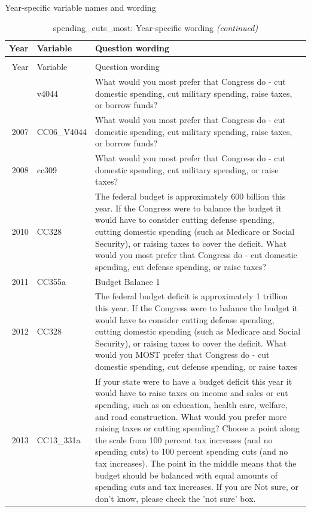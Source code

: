 \documentclass[12pt]{article}
\begin{document}
Year-specific variable names and wording

\begin{longtable}[t]{rl>{\raggedright\arraybackslash}p{10cm}}
\caption{\label{tab:unnamed-chunk-4}spending\_cuts\_most: Year-specific wording}\\
\toprule
Year & Variable & Question wording\\
\midrule
\endfirsthead
\caption[]{spending\_cuts\_most: Year-specific wording \textit{(continued)}}\\
\toprule
Year & Variable & Question wording\\
\midrule
\endhead
\
\endfoot
\bottomrule
\endlastfoot
2006 & v4044 & What would you most prefer that Congress do - cut domestic spending, cut military spending, raise taxes, or borrow funds?\\
2007 & CC06\_V4044 & What would you most prefer that Congress do - cut domestic spending, cut military spending, raise taxes, or borrow funds?\\
2008 & cc309 & What would you most prefer that Congress do - cut domestic spending, cut military spending, or raise taxes?\\
2010 & CC328 & The federal budget is approximately 600 billion this year. If the Congress were to balance the budget it would have to consider cutting defense spending, cutting domestic spending (such as Medicare or Social Security), or raising taxes to cover the deficit. What would you most prefer that Congress do - cut domestic spending, cut defense spending, or raise taxes?\\
2011 & CC355a & Budget Balance 1\\
2012 & CC328 & The federal budget deficit is approximately 1 trillion this year. If the Congress were to balance the budget it would have to consider cutting defense spending, cutting domestic spending (such as Medicare and Social Security), or raising taxes to cover the deficit. What would you MOST prefer that Congress do - cut domestic spending, cut defense spending, or raise taxes\\
2013 & CC13\_331a & If your state were to have a budget deficit this year it would have to raise taxes on income and sales or cut spending, such as on education, health care, welfare, and road construction. What would you prefer more raising taxes or cutting spending? Choose a point along the scale from 100 percent tax increases (and no spending cuts) to 100 percent spending cuts (and no tax increases). The point in the middle means that the budget should be balanced with equal amounts of spending cuts and tax increases. If you are Not sure, or don't know, please check the 'not sure' box.\\

\end{longtable}
\end{document}
